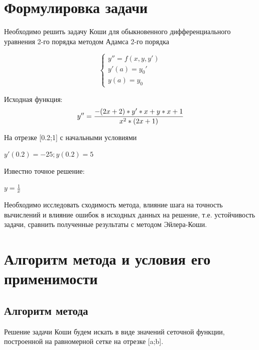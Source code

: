 






\section{Формулировка задачи}

Необходимо решить задачу Коши для обыкновенного дифференциального уравнения 2-го порядка методом Адамса 2-го порядка

\begin{equation}
	\begin{cases}
	  y''=f(x,y,y') \\
	  y'(a)=y_{0}' \\
	  y(a) = y_{0} 	
	\end{cases}
\end{equation}

Исходная функция: 
\begin{equation}
	y''=\frac{-(2x+2)*y'*x+y*x+1}{x^{2}*(2x+1)} \\
\end{equation}

На отрезке [0.2;1] с начальными условиями

\begin{math}
	y'(0.2)=-25 ;
	y(0.2) = 5 
\end{math}

Известно точное решение:

\begin{math}
	y=\frac{1}{x}
\end{math}

Необходимо исследовать сходимость метода, влияние шага на точность вычислений и влияние ошибок в исходных данных на решение, т.е. устойчивость задачи, сравнить полученные результаты с методом Эйлера-Коши.

\section{Алгоритм метода и условия его применимости}

\subsection{Алгоритм метода}

Решение задачи Коши будем искать в виде значений сеточной функции, построенной на равномерной сетке на отрезке [a;b]. 

